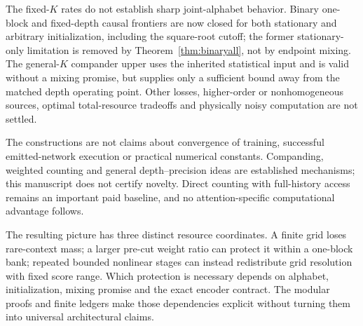 \documentclass[11pt,letterpaper]{article}
\theoremstyle{definition}\newtheorem{definition}[theorem]{Definition}
\theoremstyle{remark}\newtheorem{remark}[theorem]{Remark}
\begin{document}
The fixed-$K$ rates do not establish sharp joint-alphabet behavior. Binary one-block and fixed-depth causal frontiers are now closed for both stationary and arbitrary initialization, including the square-root cutoff; the former stationary-only limitation is removed by Theorem~\ref{thm:binaryall}, not by endpoint mixing. The general-$K$ compander upper uses the inherited statistical input and is valid without a mixing promise, but supplies only a sufficient bound away from the matched depth operating point. Other losses, higher-order or nonhomogeneous sources, optimal total-resource tradeoffs and physically noisy computation are not settled.

The constructions are not claims about convergence of training, successful emitted-network execution or practical numerical constants. Companding, weighted counting and general depth--precision ideas are established mechanisms; this manuscript does not certify novelty. Direct counting with full-history access remains an important paid baseline, and no attention-specific computational advantage follows.

The resulting picture has three distinct resource coordinates. A finite grid loses rare-context mass; a larger pre-cut weight ratio can protect it within a one-block bank; repeated bounded nonlinear stages can instead redistribute grid resolution with fixed score range. Which protection is necessary depends on alphabet, initialization, mixing promise and the exact encoder contract. The modular proofs and finite ledgers make those dependencies explicit without turning them into universal architectural claims.

\begingroup
\small
\setlength{\bibsep}{4pt}


\endgroup
\end{document}
